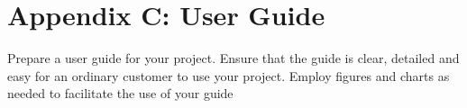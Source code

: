 \section{Appendix C: User Guide}
Prepare a user guide for your project. Ensure that the guide is clear, detailed and easy for an ordinary customer to use your project. Employ figures and charts as needed to facilitate the use of your guide
